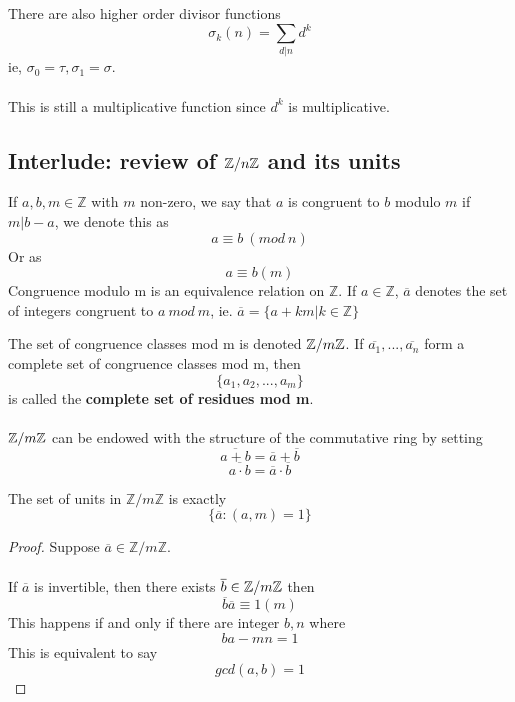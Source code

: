 \begin{remark}
There are also higher order divisor functions
\[\sigma_k(n) = \sum_{d | n} d^k\]
ie, $\sigma_0 = \tau, \sigma_1 = \sigma$.\\\\
This is still a multiplicative function since $d^k$ is multiplicative.
\end{remark}

\subsection{Interlude: review of $\mathbb{Z}/n\mathbb{Z}$ and its units}

\begin{definition}
If $a, b, m \in \mathbb{Z}$ with $m$ non-zero, we say that $a$ is congruent to $b$ modulo $m$ if $m | b - a$, we denote this as
\[a \equiv b\ (mod\ n)\]
Or as
\[a \equiv b(m)\]
Congruence modulo m is an equivalence relation on $\mathbb{Z}$. If $a \in \mathbb{Z}$, $\overline{a}$ denotes the set of integers congruent to $a\ mod\ m$, ie. $\overline{a} = \{a + km | k \in \mathbb{Z}\}$
\end{definition}

\begin{definition}
The set of congruence classes mod m is denoted $\mathbb{Z}/m\mathbb{Z}$. If $\overline{a_1}, ..., \overline{a_n}$ form a complete set of congruence classes mod m, then
\[\{a_1, a_2, ..., a_m\}\]
is called the \textbf{complete set of residues mod m}.\\\\
$\mathbb{Z}/m\mathbb{Z}$ can be endowed with the structure of the commutative ring by setting
\[\overline{a + b} = \overline{a} + \overline{b}\]
\[\overline{a \cdot b} = \overline{a} \cdot \overline{b}\]
\end{definition}

\begin{proposition}
The set of units in $\mathbb{Z}/m\mathbb{Z}$ is exactly
\[\{\overline{a}: (a, m) = 1\}\]
\end{proposition}

\begin{proof}
Suppose $\overline{a} \in \mathbb{Z}/m\mathbb{Z}$.\\\\
If $\overline{a}$ is invertible, then there exists $\overline{b} \in \mathbb{Z}/m\mathbb{Z}$ then
\[\overline{b}\overline{a} \equiv 1(m)\]
This happens if and only if there are integer $b, n$ where
\[ba - mn = 1\]
This is equivalent to say
\[gcd(a, b) = 1\]
\end{proof}

